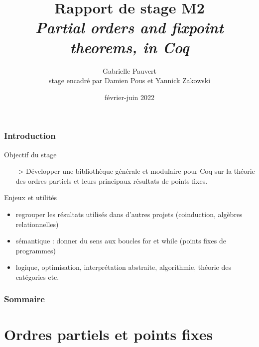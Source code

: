 \documentclass{beamer}
\title[\textit{Partial orders and fixpoint theorems, in Coq} ~~~~~~~~~~~~~~~~~~~~~ \insertframenumber]{Rapport de stage M2 \\
\textit{Partial orders and fixpoint theorems, in Coq}}
\date{février-juin 2022}
\author[Gabrielle Pauvert]{Gabrielle Pauvert\\
stage encadré par Damien Pous et Yannick Zakowski}
\begin{document}
\begin{frame}
\titlepage
\end{frame}



\begin{frame}
\frametitle{Introduction}

\begin{block}{Objectif du stage}
\begin{itemize}
\item[->] Développer une bibliothèque générale et modulaire pour Coq sur la théorie des ordres partiels et leurs principaux résultats de points fixes.
\end{itemize}
\end{block}

\begin{exampleblock}{Enjeux et utilités}
\begin{itemize}
\item regrouper les résultats utilisés dans d'autres projets (coinduction, algèbres relationnelles)
\item sémantique : donner du sens aux boucles for et while (points fixes de programmes)
\item logique, optimisation, interprétation abstraite, algorithmie, théorie des catégories etc.
\end{itemize}
\end{exampleblock}

\end{frame}


\begin{frame}
\frametitle{Sommaire}
\small{\tableofcontents}
\end{frame}





\section{Ordres partiels et points fixes}
\end{document}
